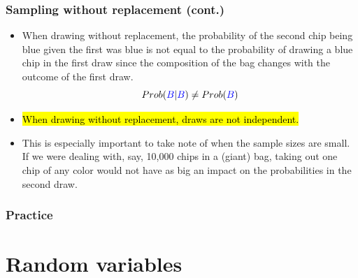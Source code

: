 \documentclass[notes,11pt, aspectratio=169]{beamer}
\begin{document}
\begin{frame}
\frametitle{Sampling without replacement (cont.)}

\begin{itemize}

\item When drawing without replacement, the probability of the second chip being blue given the first was blue is not equal to the probability of drawing a blue chip in the first draw since the composition of the bag changes with the outcome of the first draw.
\[ Prob(\textcolor{blue}{B} | \textcolor{blue}{B}) \ne Prob(\textcolor{blue}{B}) \]

\pause

\item \hl{When drawing without replacement, draws are not independent.}

\pause

\item This is especially important to take note of when the sample sizes are small. If we were dealing with, say, 10,000 chips in a (giant) bag, taking out one chip of any color would not have as big an impact on the probabilities in the second draw.

\end{itemize}

\end{frame}


\begin{frame}
\frametitle{Practice}


{
\soln{
\pause
\[ P(ace~then~3) = \frac{4}{52} \times \frac{4}{51} \approx 0.0060 \]
}}

\end{frame}



\section{Random variables}
\end{document}
